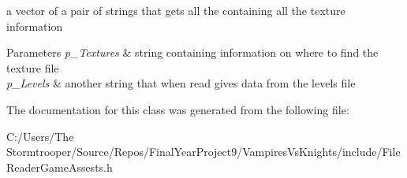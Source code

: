 a vector of a pair of strings that gets all the containing all the texture information 


\begin{DoxyParams}{Parameters}
{\em p\+\_\+\+Textures} & string containing information on where to find the texture file \\
\hline
{\em p\+\_\+\+Levels} & another string that when read gives data from the levels file \\
\hline
\end{DoxyParams}


The documentation for this class was generated from the following file\+:\begin{DoxyCompactItemize}
\item 
C\+:/\+Users/\+The Stormtrooper/\+Source/\+Repos/\+Final\+Year\+Project9/\+Vampires\+Vs\+Knights/include/File\+Reader\+Game\+Assests.\+h\end{DoxyCompactItemize}
